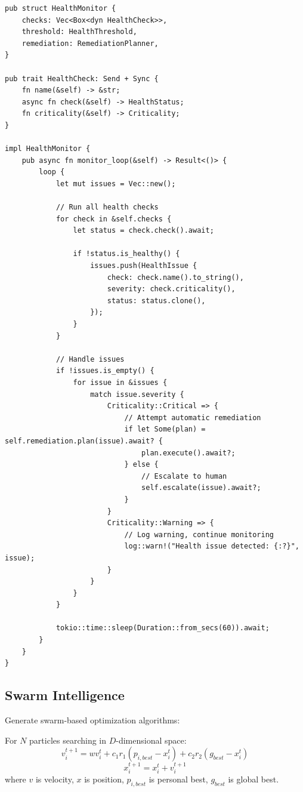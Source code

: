 \begin{verbatim}
pub struct HealthMonitor {
    checks: Vec<Box<dyn HealthCheck>>,
    threshold: HealthThreshold,
    remediation: RemediationPlanner,
}

pub trait HealthCheck: Send + Sync {
    fn name(&self) -> &str;
    async fn check(&self) -> HealthStatus;
    fn criticality(&self) -> Criticality;
}

impl HealthMonitor {
    pub async fn monitor_loop(&self) -> Result<()> {
        loop {
            let mut issues = Vec::new();

            // Run all health checks
            for check in &self.checks {
                let status = check.check().await;

                if !status.is_healthy() {
                    issues.push(HealthIssue {
                        check: check.name().to_string(),
                        severity: check.criticality(),
                        status: status.clone(),
                    });
                }
            }

            // Handle issues
            if !issues.is_empty() {
                for issue in &issues {
                    match issue.severity {
                        Criticality::Critical => {
                            // Attempt automatic remediation
                            if let Some(plan) = self.remediation.plan(issue).await? {
                                plan.execute().await?;
                            } else {
                                // Escalate to human
                                self.escalate(issue).await?;
                            }
                        }
                        Criticality::Warning => {
                            // Log warning, continue monitoring
                            log::warn!("Health issue detected: {:?}", issue);
                        }
                    }
                }
            }

            tokio::time::sleep(Duration::from_secs(60)).await;
        }
    }
}
\end{verbatim}

\subsection{Swarm Intelligence}

Generate swarm-based optimization algorithms:

\begin{definition}
    For $N$ particles searching in $D$-dimensional space:
    \begin{equation}
        v_{i}^{t+1} = w v_{i}^{t} + c_1 r_1 (p_{i,best} - x_{i}^{t}) + c_2 r_2 (g_{best} - x_{i}^{t})
    \end{equation}
    \begin{equation}
        x_{i}^{t+1} = x_{i}^{t} + v_{i}^{t+1}
    \end{equation}
    where $v$ is velocity, $x$ is position, $p_{i,best}$ is personal best, $g_{best}$ is global best.
\end{definition}

